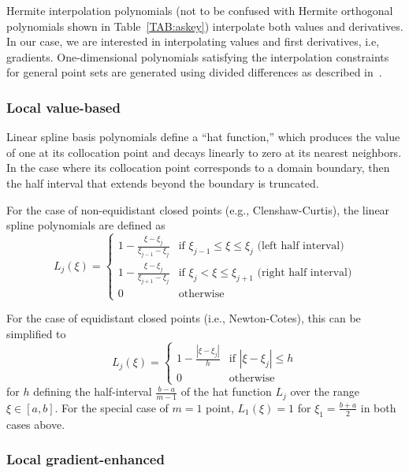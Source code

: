 Hermite interpolation polynomials (not to be confused with Hermite
orthogonal polynomials shown in Table~\ref{TAB:askey}) interpolate
both values and derivatives.  In our case, we are interested in
interpolating values and first derivatives, i.e, gradients.
One-dimensional polynomials satisfying the interpolation constraints
for general point sets are generated using divided differences as
described in~\cite{Burk11}.

\subsubsection{Local value-based} \label{uq:expansion:interp:linear}

Linear spline basis polynomials define a ``hat function,'' 
which produces the value of one at its collocation point and decays 
linearly to zero at its nearest neighbors.  In the case where its
collocation point corresponds to a domain boundary, then the half
interval that extends beyond the boundary is truncated.

For the case of non-equidistant closed points (e.g., Clenshaw-Curtis),
the linear spline polynomials are defined as
\begin{equation}
L_j(\xi) = 
\begin{cases}
1 - \frac{\xi - \xi_j}{\xi_{j-1} - \xi_j} & 
\text{if $\xi_{j-1} \leq \xi \leq \xi_j$ (left half interval)}\\
1 - \frac{\xi - \xi_j}{\xi_{j+1} - \xi_j} & 
\text{if $\xi_j < \xi \leq \xi_{j+1}$ (right half interval)}\\
0 & \text{otherwise}
\end{cases}
\end{equation}

For the case of equidistant closed points (i.e., Newton-Cotes), this
can be simplified to
\begin{equation}
L_j(\xi) = 
\begin{cases}
1 - \frac{|\xi - \xi_j|}{h} & \text{if $|\xi - \xi_j| \leq h$}\\
0                           & \text{otherwise}
\end{cases}
\end{equation}
for $h$ defining the half-interval $\frac{b - a}{m - 1}$ of the hat
function $L_j$ over the range $\xi \in [a, b]$.  For the special case
of $m = 1$ point, $L_1(\xi) = 1$ for $\xi_1 = \frac{b+a}{2}$ in both 
cases above.

\subsubsection{Local gradient-enhanced} \label{uq:expansion:interp:cubic}


